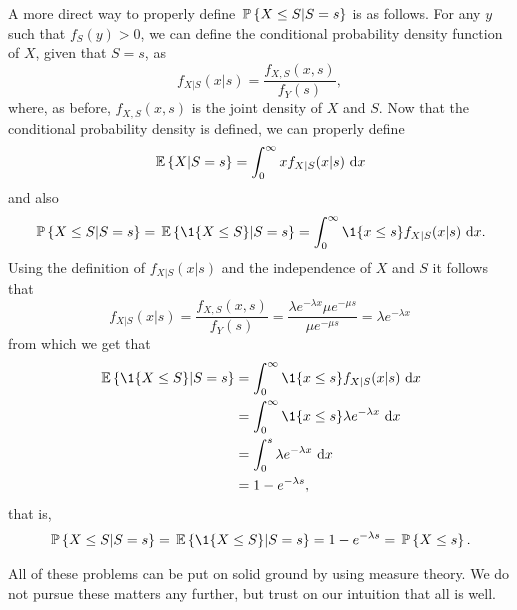 \begin{question}
\begin{solution}
A more direct way to properly define $\P{X\leq S| S=s}$ is as follows. For any $y$ such that $f_S(y) > 0$, we can define the conditional probability density function of $X$, given that $S=s$, as 
\begin{equation*}
  f_{X|S}(x|s) = \frac{f_{X, S}( x, s)}{f_Y(s)},
\end{equation*}
where, as before, $f_{X, S}( x, s)$ is the joint density of $X$ and $S$. Now that the conditional probability density is defined, we can properly define
\begin{equation*}
  \E {X| S=s } = \int_0^\infty x   f_{X|S}(x|s)\, \d x
\end{equation*}
and also
\begin{equation*}
  \begin{split}
  \P{X\leq S| S=s } = \E{\1{X \leq S}| S=s } = \int_0^\infty \1{x \leq s}   f_{X|S}(x|s)\, \d x.
  \end{split}
\end{equation*}
Using the definition of $f_{X|S}(x|s)$ and the independence of $X$ and $S$ it follows that
\begin{equation*}
  f_{X|S}(x|s) = \frac{f_{X, S}( x, s)}{f_Y(s)} = \frac{\lambda e^{-\lambda x} \mu e^{-\mu s}}{\mu e^{-\mu s}} = \lambda e^{-\lambda x}
\end{equation*}
from which we get that 
\begin{equation*}
  \begin{split}
  \E{\1{X \leq S}| S=s } 
&= \int_0^\infty \1{x \leq s}   f_{X|S}(x|s)\, \d x \\
&= \int_0^\infty \1{x \leq s} \lambda e^{-\lambda x}\, \d x \\
&= \int_0^s \lambda e^{-\lambda x}\, \d x \\
&= 1 - e^{-\lambda s},
  \end{split}
\end{equation*}
that is,
\begin{equation*}
  \begin{split}
  \P{X\leq S| S=s} = \E{\1{X \leq S}| S=s } = 1 - e^{-\lambda s}  = \P{X \leq s}.
  \end{split}
\end{equation*}

All of these problems can be put on solid ground by using measure
theory. We do not pursue these matters any further, but trust on our
intuition that all is well.

\end{solution}
\end{question}



